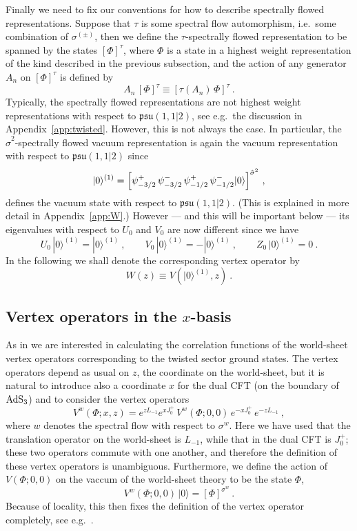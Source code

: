 \documentclass[a4paper,11pt]{article}
\numberwithin{equation}{section}
\def\be{\begin{equation}}
\def\ee{\end{equation}}
\begin{document}
Finally we need to fix our conventions for how to describe spectrally flowed representations. 
Suppose that $\tau$ is some spectral flow automorphism, i.e.\ some combination of $\sigma^{(\pm)}$, then we define the $\tau$-spectrally flowed representation to be spanned by the  states $[\Phi]^\tau$, where $\Phi$ is a state in a highest weight representation of the kind described in the previous subsection, and the action of any generator $A_n$ on $[\Phi]^\tau$ is defined by 
\be\label{specflow}
A_n \, [\Phi]^\tau  \equiv [ \tau(A_n)\, \Phi ]^\tau \ . 
\ee
Typically, the spectrally flowed representations are not highest weight representations with respect to $\mathfrak{psu}(1,1|2)$, see e.g.\ the discussion in Appendix~\ref{app:twisted}. However, this is not always the case. In particular, the $\hat{\sigma}^2$-spectrally flowed vacuum representation is again the vacuum representation with respect to $\mathfrak{psu}(1,1|2)$ since 
\be\label{Wdef}
|0\rangle^{(1)} = \Bigl[ \psi^+_{-3/2} \, \psi^-_{-3/2} \,  \psi^+_{-1/2} \,  \psi^-_{-1/2} |0\rangle \Bigr]^{\hat{\sigma}^2} \ , 
\ee
defines the vacuum state with respect to $\mathfrak{psu}(1,1|2)$. (This is explained in more detail in Appendix~\ref{app:W}.) However --- and this will be important below --- its eigenvalues with respect to $U_0$ and $V_0$ are now different since we have 
\be\label{Wcharges}
U_0 \, |0\rangle^{(1)} = |0\rangle^{(1)} \ , \qquad V_0 \, |0\rangle^{(1)} = - |0\rangle^{(1)} \ , \qquad 
Z_0 \, |0\rangle^{(1)} = 0 \ . 
\ee
In the following we shall denote the corresponding vertex operator by 
\be\label{Wfield}
W(z) \equiv V(|0\rangle^{(1)},z) \ . 
\ee

\subsection[Vertex operators in the \texorpdfstring{$x$}{x}-basis]{\boldmath Vertex operators in the \texorpdfstring{$x$}{x}-basis}

As in \cite{Eberhardt:2019ywk} we are interested in calculating the correlation functions of the world-sheet vertex operators corresponding to the twisted sector ground states. The vertex operators depend as usual on $z$, the coordinate on the world-sheet, but it is natural to introduce also a coordinate $x$ for the dual CFT (on the boundary of ${\rm AdS}_3$) and to consider the vertex operators 
\be
V^{w}(\Phi;x,z) =  e^{ z L_{-1}} e^{x J^+_0} \, V^{w}(\Phi;0,0) \, e^{-x J^+_0} \, e^{- z L_{-1}} \ ,
\ee
where $w$ denotes the spectral flow with respect to $\sigma^w$. 
Here we have used that the translation operator on the world-sheet is $L_{-1}$, while that in the dual CFT is $J^+_0$; these two operators commute with one another, and therefore the definition of these vertex operators is unambiguous. Furthermore, we define the action of $V(\Phi;0,0)$ on the vaccum of the world-sheet theory to be the state $\Phi$, 
\be
V^{w}(\Phi;0,0) \, |0\rangle = [\Phi]^{\sigma^w} \ . 
\ee
Because of locality, this then fixes the definition of the vertex operator completely, see e.g.\ \cite{Goddard:1989dp,Gaberdiel:1998fs}.
\end{document}
